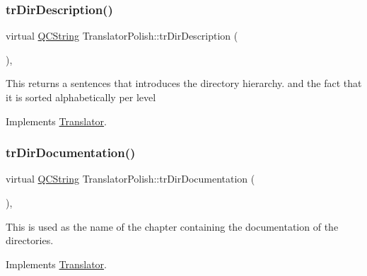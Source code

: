 \mbox{\label{class_translator_polish_af2a02431db34db38fb46515dda127bc6}} 
\subsubsection{\texorpdfstring{trDirDescription()}{trDirDescription()}}
{\footnotesize\ttfamily virtual \mbox{\hyperlink{class_q_c_string}{Q\+C\+String}} Translator\+Polish\+::tr\+Dir\+Description (\begin{DoxyParamCaption}{ }\end{DoxyParamCaption})\hspace{0.3cm}{\ttfamily [inline]}, {\ttfamily [virtual]}}

This returns a sentences that introduces the directory hierarchy. and the fact that it is sorted alphabetically per level 

Implements \mbox{\hyperlink{class_translator}{Translator}}.

\mbox{\label{class_translator_polish_a9f94a092939c9b385027bacc8710197f}} 
\subsubsection{\texorpdfstring{trDirDocumentation()}{trDirDocumentation()}}
{\footnotesize\ttfamily virtual \mbox{\hyperlink{class_q_c_string}{Q\+C\+String}} Translator\+Polish\+::tr\+Dir\+Documentation (\begin{DoxyParamCaption}{ }\end{DoxyParamCaption})\hspace{0.3cm}{\ttfamily [inline]}, {\ttfamily [virtual]}}

This is used as the name of the chapter containing the documentation of the directories. 

Implements \mbox{\hyperlink{class_translator}{Translator}}.

\mbox{\label{class_translator_polish_a38f80f778fd5f49b9a46a725b8fea137}} 

